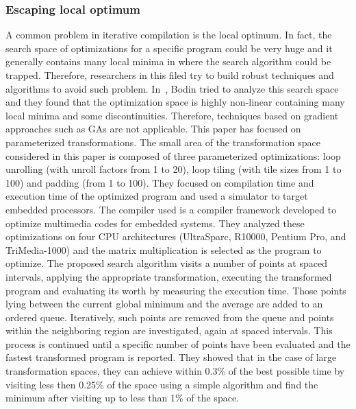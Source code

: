 
\subsubsection{Escaping local optimum}


A common problem in iterative compilation is the local optimum. In fact, the search space of optimizations for a specific program could be very huge and it generally contains many local minima in where the search algorithm could be trapped\cite{bodin1998iterative}. Therefore, researchers in this filed try to build robust techniques and algorithms to avoid such problem.
In~\cite{bodin1998iterative}, Bodin \etal tried to analyze this search space and they found that the optimization space is highly non-linear containing many local minima and some discontinuities. Therefore, techniques based on gradient approaches such as GAs are not applicable.
This paper has focused on parameterized transformations. The small area of the transformation space considered in this paper is composed of three parameterized optimizations: loop unrolling (with unroll factors from 1 to 20), loop tiling (with tile sizes from 1 to 100) and padding (from 1 to 100). They focused on compilation time and execution time of the optimized program and used a simulator to target embedded processors. The compiler used is a compiler framework developed to optimize multimedia codes for embedded systems.
They analyzed these optimizations on four CPU architectures (UltraSparc, R10000, Pentium Pro, and TriMedia-1000) and the matrix multiplication is selected as the program to optimize.
The proposed search algorithm visits a number of points at spaced intervals, applying the appropriate transformation, executing
the transformed program and evaluating its worth by measuring the execution time. Those points lying between
the current global minimum and the average are added to an ordered queue. Iteratively, such points are removed from the queue and points within the neighboring region are investigated, again at spaced intervals. This process is continued until a specific number of points have been evaluated and the fastest transformed program is reported.
They showed that in the case of large transformation spaces, they can achieve within 0.3\% of the best possible time by visiting less then 0.25\% of the space using a simple algorithm and find the minimum after visiting up to less than 1\% of the space.

